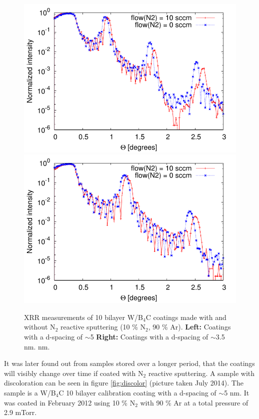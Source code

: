 \begin{figure}[!h]
	\center
  \includegraphics[width=0.47\linewidth]{figures/athena/coatings/w-b4c_n2_50AA.pdf}	\includegraphics[width=0.47\linewidth]{figures/athena/coatings/w-b4c_n2_35AA.pdf}
\caption{\footnotesize XRR measurements of 10 bilayer W/B$_4$C coatings made with and without N$_2$ reactive sputtering (10 \% N$_2$, 90 \% Ar).  \textbf{Left:} Coatings with a d-spacing of $\sim$5 \textbf{Right:} Coatings with a d-spacing of $\sim$3.5 nm. nm.}\label{fig:wb4c-n2}
\end{figure}

It was later found out from samples stored over a longer period, that the coatings will visibly change over time if coated with N$_2$ reactive sputtering. A sample with discoloration can be seen in figure \ref{fig:discolor} (picture taken July 2014). The sample is a W/B$_4$C 10 bilayer calibration coating with a d-spacing of $\sim$5 nm. It was coated in February 2012 using 10 \% N$_2$ with 90 \% Ar at a total pressure of 2.9 mTorr.

